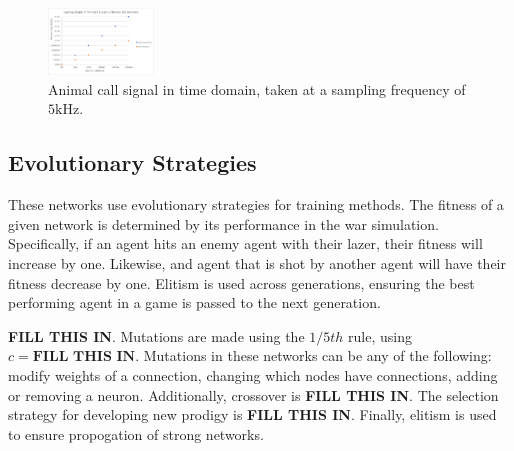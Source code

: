 \documentclass[journal]{IEEEtran}
\begin{document}
    \begin{figure}[h]
      \centering
      \includegraphics[width=0.25\textwidth,natwidth=300,natheight=200]{fig/828.png}
      \caption{Animal call signal in time domain, taken at a sampling frequency of $5\si{\kilo\hertz}$.}
      \label{fig:call}
  \end{figure}
  

    \subsection{Evolutionary Strategies}
    These networks use evolutionary strategies for training methods. The fitness of a given network is determined by its performance
    in the war simulation. Specifically, if an agent hits an enemy agent with their lazer, their fitness will increase by one. Likewise,
    and agent that is shot by another agent will have their fitness decrease by one. Elitism is used across generations, ensuring the 
    best performing agent in a game is passed to the next generation. 

    \textbf{FILL THIS IN}. Mutations are made using the $1/5th$ rule, using $c=\textbf{FILL THIS IN}$.
    Mutations in these networks can be any of the following: modify weights of a connection, changing which nodes have connections,
    adding or removing a neuron. Additionally, crossover is \textbf{FILL THIS IN}. The selection strategy for developing new 
    prodigy is \textbf{FILL THIS IN}. Finally, elitism is used to ensure propogation of strong networks. 
\end{document}
